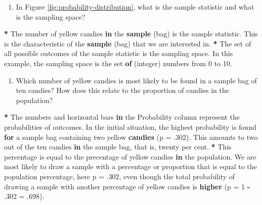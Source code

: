 \documentclass[a4paper]{book}
\newenvironment{Shaded}{\begin{snugshade}}{\end{snugshade}}
\newcommand{\KeywordTok}[1]{\textcolor[rgb]{0,0,0}{\textbf{#1}}}
\newcommand{\DataTypeTok}[1]{\textcolor[rgb]{0,0,0}{#1}}
\newcommand{\DecValTok}[1]{\textcolor[rgb]{0.00,0.00,0.00}{#1}}
\newcommand{\StringTok}[1]{\textcolor[rgb]{0.00,0.00,0.00}{#1}}
\newcommand{\ControlFlowTok}[1]{\textcolor[rgb]{0.00,0.00,0.00}{\textbf{#1}}}
\newcommand{\OperatorTok}[1]{\textcolor[rgb]{0.00,0.00,0.00}{\textbf{#1}}}
\newcommand{\NormalTok}[1]{#1}
\providecommand{\tightlist}{%
  \setlength{\itemsep}{0pt}\setlength{\parskip}{0pt}}
\theoremstyle{definition}
\theoremstyle{definition}
\theoremstyle{definition}
\theoremstyle{remark}
\begin{document}
\begin{enumerate}
\def\labelenumi{\arabic{enumi}.}
\tightlist
\item
  In Figure \ref{fig:probability-distribution}, what is the sample
  statistic and what is the sampling space?
\end{enumerate}

\begin{Shaded}
\begin{Highlighting}[]
\OperatorTok{*}\StringTok{ }\NormalTok{The number of yellow candies }\ControlFlowTok{in}\NormalTok{ the }\KeywordTok{sample}\NormalTok{ (bag) is the sample statistic.}
\NormalTok{This is the characteristic of the }\KeywordTok{sample}\NormalTok{ (bag) that we are interested in.}
\OperatorTok{*}\StringTok{ }\NormalTok{The set of all possible outcomes of the sample statistic is the sampling}
\NormalTok{space. In this example, the sampling space is the set }\KeywordTok{of}\NormalTok{ (integer) numbers}
\NormalTok{from }\DecValTok{0}\NormalTok{ to }\DecValTok{10}\NormalTok{.}
\end{Highlighting}
\end{Shaded}

\begin{enumerate}
\def\labelenumi{\arabic{enumi}.}
\setcounter{enumi}{1}
\tightlist
\item
  Which number of yellow candies is most likely to be found in a sample
  bag of ten candies? How does this relate to the proportion of candies
  in the population?
\end{enumerate}

\begin{Shaded}
\begin{Highlighting}[]
\OperatorTok{*}\StringTok{ }\NormalTok{The numbers and horizontal bars }\ControlFlowTok{in}\NormalTok{ the Probability column represent the}
\NormalTok{probabilities of outcomes. In the initial situation, the highest probability}
\NormalTok{is found }\ControlFlowTok{for}\NormalTok{ a sample bag containing two yellow }\KeywordTok{candies}\NormalTok{ (}\DataTypeTok{p =}\NormalTok{ .}\DecValTok{302}\NormalTok{). This}
\NormalTok{amounts to two out of the ten candies }\ControlFlowTok{in}\NormalTok{ the sample bag, that is, twenty per}
\NormalTok{cent.}
\OperatorTok{*}\StringTok{ }\NormalTok{This percentage is equal to the precentage of yellow candies }\ControlFlowTok{in}\NormalTok{ the}
\NormalTok{population. We are most likely to draw a sample with a percentage or}
\NormalTok{proportion that is equal to the population percentage, here p =}\StringTok{ }\NormalTok{.}\DecValTok{302}\NormalTok{, even}
\NormalTok{though the total probability of drawing a sample with another percentage of}
\NormalTok{yellow candies is }\KeywordTok{higher}\NormalTok{ (}\DataTypeTok{p =} \DecValTok{1} \OperatorTok{-}\StringTok{ }\DataTypeTok{.302 =}\NormalTok{ .}\DecValTok{698}\NormalTok{).}
\end{Highlighting}
\end{Shaded}
\end{document}
